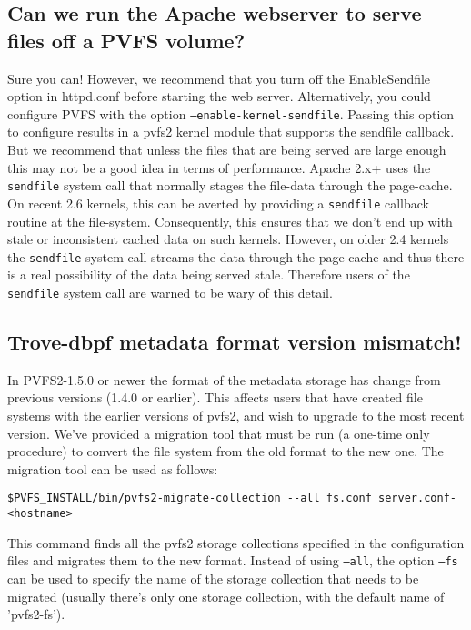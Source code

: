 \documentclass[11pt,letterpaper]{article}
\begin{document}
\subsection{Can we run the Apache webserver to serve files off a PVFS volume?}

Sure you can! However, we recommend that you turn off the EnableSendfile option in
httpd.conf before starting the web server. Alternatively, you could configure
PVFS with the option \texttt{--enable-kernel-sendfile}. Passing this option
to configure results in a pvfs2 kernel module that supports the sendfile
callback.
But we recommend that unless the files that are being served are large enough
this may not be a good idea in terms of performance. Apache 2.x+ uses the {\tt sendfile}
system call that normally stages the file-data through the page-cache. On recent 2.6 kernels,
this can be averted by providing a {\tt sendfile} callback routine at the file-system.
Consequently, this ensures that we don't end up with stale or inconsistent cached data on such
kernels. However, on older 2.4 kernels the {\tt sendfile} system call streams the data through
the page-cache and thus there is a real possibility of the data being served stale.
Therefore users of the {\tt sendfile} system call are warned to be wary of this detail.

\subsection{Trove-dbpf metadata format version mismatch!}
\label{sec:trove-migration}

In PVFS2-1.5.0 or newer the format of the metadata storage has change from
previous versions (1.4.0 or earlier).  This affects users that have created
file systems with the earlier versions of pvfs2, and wish to upgrade to the
most recent version.  We've provided a migration tool that must be run
(a one-time only procedure) to convert the file system from the old format
to the new one.  The migration tool can be used as follows:
\begin{verbatim}
$PVFS_INSTALL/bin/pvfs2-migrate-collection --all fs.conf server.conf-<hostname>
\end{verbatim}
This command finds all the pvfs2 storage collections specified in the
configuration files and migrates them to the new format.  Instead of
using {\tt --all}, the option {\tt --fs} can be used to specify the name of
the storage collection that needs to be migrated (usually there's only
one storage collection, with the default name of 'pvfs2-fs').
\end{document}
